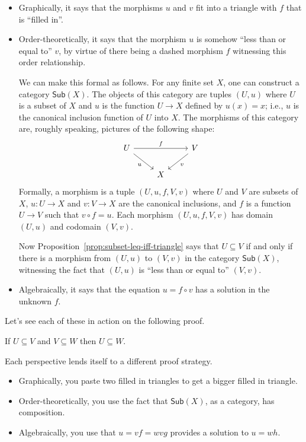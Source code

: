 \begin{itemize}
\item Graphically, it says that the morphisms \(u\) and \(v\)
  fit into a triangle with \(f\) that is ``filled in''.
\item Order-theoretically, it says that the morphism \(u\) is somehow
  ``less than or equal to'' \(v\), by virtue of there being a dashed morphism
  \(f\) witnessing this order relationship.

  We can make this formal as follows.
  For any finite set \(X\), one can construct a category \(\mathsf{Sub}(X)\).
  The objects of this category are tuples \((U,u)\) where \(U\) is a subset of \(X\)
  and \(u\) is the function \(U \to X\) defined by \(u(x) = x\);
  i.e., \(u\) is the canonical inclusion function of \(U\) into \(X\).
  The morphisms of this category are, roughly speaking,
  pictures of the following shape:
  \[
\begin{tikzcd}
U \arrow[rd, "u"'] \arrow[rr, "f"] &   & V \arrow[ld, "v"] \\
                                   & X &
\end{tikzcd}
  \]
  Formally, a morphism is a tuple \((U,u,f,V,v)\)
  where \(U\) and \(V\) are subsets of \(X\),
  \(u : U \to X\) and \(v : V \to X\) are the canonical inclusions,
  and \(f\) is a function \(U \to V\)
  such that \(v \circ f = u\).
  Each morphism \((U,u,f,V,v)\) has domain \((U,u)\)
  and codomain \((V,v)\).

  Now Proposition~\ref{prop:subset-leq-iff-triangle}
  says that \(U\subseteq V\) if and only if there is a morphism from \((U,u)\)
  to \((V,v)\) in the category \(\mathsf{Sub}(X)\),
  witnessing the fact that \((U,u)\) is ``less than or equal to'' \((V,v)\).

\item Algebraically, it says that the equation \(u = f \circ v\)
  has a solution in the unknown \(f\).
\end{itemize}
Let's see each of these in action on the following proof.
\begin{proposition}
  If \(U\subseteq V\) and \(V \subseteq W\) then \(U\subseteq W\).
\end{proposition}
Each perspective lends itself to a different proof strategy.
\begin{itemize}
\item Graphically, you paste two filled in triangles to get a bigger filled in triangle.
\item Order-theoretically, you use the fact that \(\mathsf{Sub}(X)\), as a category,
  has composition.
\item Algebraically, you use that \(u = vf = wvg\) provides a solution to \(u = wh\).
\end{itemize}

